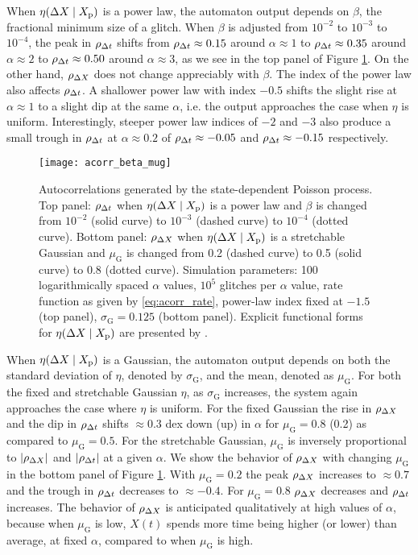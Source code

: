 When $\eta(\Delta X \mid X_{\textrm{p}})$ is a power law, the automaton output depends on $\beta$, the fractional minimum size of a glitch. When $\beta$ is adjusted from $10^{-2}$ to $10^{-3}$ to $10^{-4}$, the peak in $\rho_{\Delta t}$ shifts from $\rho_{\Delta t} \approx 0.15$ around $\alpha \approx 1$ to $\rho_{\Delta t} \approx 0.35$ around $\alpha \approx 2$ to $\rho_{\Delta t} \approx 0.50$ around $\alpha \approx 3$, as we see in the top panel of Figure \ref{fig:acorr_beta_mug}. On the other hand, $\rho_{\Delta X}$ does not change appreciably with $\beta$. The index of the power law also affects $\rho_{\Delta t}$. A shallower power law with index $-0.5$ shifts the slight rise at $\alpha \approx 1$ to a slight dip at the same $\alpha$, i.e. the output approaches the case when $\eta$ is uniform. Interestingly, steeper power law indices of $-2$ and $-3$ also produce a small trough in $\rho_{\Delta t}$ at $\alpha \approx 0.2$ of $\rho_{\Delta t} \approx -0.05$ and $\rho_{\Delta t} \approx -0.15$ respectively. 

\begin{figure}
	\centering
	\texttt{[image: acorr\_beta\_mug]}
	\caption{Autocorrelations generated by the state-dependent Poisson process. Top panel: $\rho_{\Delta t}$ when $\eta(\Delta X \mid X_{\textrm{p}})$ is a power law and $\beta$ is changed from $10^{-2}$ (solid curve) to $10^{-3}$ (dashed curve) to $10^{-4}$ (dotted curve). Bottom panel: $\rho_{\Delta X}$ when $\eta(\Delta X \mid X_{\textrm{p}})$ is a stretchable Gaussian and $\mu_\textrm{G}$ is changed from 0.2 (dashed curve) to 0.5 (solid curve) to 0.8 (dotted curve). Simulation parameters: 100 logarithmically spaced $\alpha$ values, $10^5$ glitches per $\alpha$ value, rate function as given by \eqref{eq:acorr_rate}, power-law index fixed at $-1.5$ (top panel), $\sigma_\textrm{G}=0.125$ (bottom panel). Explicit functional forms for $\eta(\Delta X \mid X_{\textrm{p}})$ are presented by \citet[Table 1]{Carlin2019quasi}.}
	\label{fig:acorr_beta_mug}
\end{figure}

When $\eta(\Delta X \mid X_{\textrm{p}})$ is a Gaussian, the automaton output depends on both the standard deviation of $\eta$, denoted by $\sigma_\textrm{G}$, and the mean, denoted as $\mu_\textrm{G}$. For both the fixed and stretchable Gaussian $\eta$, as $\sigma_\textrm{G}$ increases, the system again approaches the case where $\eta$ is uniform. For the fixed Gaussian the rise in $\rho_{\Delta X}$ and the dip in $\rho_{\Delta t}$ shifts $\approx0.3$ dex down (up) in $\alpha$ for $\mu_\textrm{G} = 0.8$ (0.2) as compared to $\mu_\textrm{G} = 0.5$. For the stretchable Gaussian, $\mu_\textrm{G}$ is inversely proportional to $|\rho_{\Delta X}|$ and $|\rho_{\Delta t}|$ at a given $\alpha$. We show the behavior of $\rho_{\Delta X}$ with changing $\mu_\textrm{G}$ in the bottom panel of Figure \ref{fig:acorr_beta_mug}. With $\mu_\textrm{G} =0.2$ the peak $\rho_{\Delta X}$ increases to $\approx 0.7$ and the trough in $\rho_{\Delta t}$ decreases to $\approx -0.4$. For $\mu_\textrm{G} = 0.8$ $\rho_{\Delta X}$ decreases and $\rho_{\Delta t}$ increases. The behavior of $\rho_{\Delta X}$ is anticipated qualitatively at high values of $\alpha$, because when $\mu_\textrm{G}$ is low, $X(t)$ spends more time being higher (or lower) than average, at fixed $\alpha$, compared to when $\mu_\textrm{G}$ is high.

